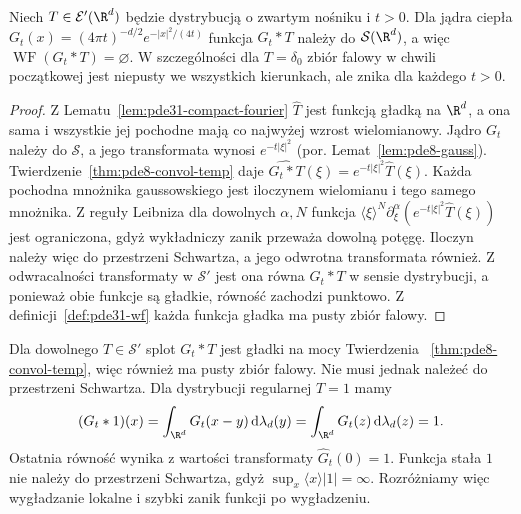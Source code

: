\begin{stwierdzenie}
\label{prop:pde-v44-heat-wavefront}
Niech $T\in\mathcal E'(\R^d)$ będzie dystrybucją
o zwartym nośniku i $t>0$. Dla jądra ciepła
$G_t(x)=(4\pi t)^{-d/2}e^{-|x|^2/(4t)}$
funkcja $G_t*T$ należy do $\mathcal S(\R^d)$,
a więc $\operatorname{WF}(G_t*T)=\varnothing$.
W szczególności dla $T=\delta_0$ zbiór falowy
w chwili początkowej jest niepusty we wszystkich
kierunkach, ale znika dla każdego $t>0$.
\end{stwierdzenie}
\begin{proof}
Z Lematu~\ref{lem:pde31-compact-fourier}
$\widehat T$ jest funkcją gładką na $\R^d$,
a ona sama i wszystkie jej pochodne mają
co najwyżej wzrost wielomianowy.
Jądro $G_t$ należy do $\mathcal S$, a jego
transformata wynosi $e^{-t|\xi|^2}$
(por. Lemat~\ref{lem:pde8-gauss}).
Twierdzenie~\ref{thm:pde8-convol-temp} daje
$\widehat{G_t*T}(\xi)=e^{-t|\xi|^2}\widehat T(\xi)$.
Każda pochodna mnożnika gaussowskiego jest
iloczynem wielomianu i tego samego mnożnika.
Z reguły Leibniza dla dowolnych $\alpha,N$
funkcja $\langle\xi\rangle^N
\partial_\xi^\alpha(e^{-t|\xi|^2}\widehat T(\xi))$
jest ograniczona, gdyż wykładniczy zanik
przeważa dowolną potęgę.
Iloczyn należy więc do przestrzeni Schwartza,
a jego odwrotna transformata również.
Z odwracalności transformaty w $\mathcal S'$
jest ona równa $G_t*T$ w sensie dystrybucji,
a ponieważ obie funkcje są gładkie,
równość zachodzi punktowo.
Z definicji~\ref{def:pde31-wf} każda funkcja gładka
ma pusty zbiór falowy.
\end{proof}
\begin{uwaga}
Dla dowolnego $T\in\mathcal S'$ splot $G_t*T$
jest gładki na mocy Twierdzenia
~\ref{thm:pde8-convol-temp}, więc również ma pusty
zbiór falowy. Nie musi jednak należeć do
przestrzeni Schwartza. Dla dystrybucji regularnej
$T=1$ mamy
\[
 (G_t*1)(x)=\int_{\R^d}G_t(x-y)\,\mathrm d\lambda_d(y)
 =\int_{\R^d}G_t(z)\,\mathrm d\lambda_d(z)=1.
\]
Ostatnia równość wynika z wartości transformaty
$\widehat G_t(0)=1$. Funkcja stała $1$ nie należy
do przestrzeni Schwartza, gdyż
$\sup_x\langle x\rangle|1|=\infty$.
Rozróżniamy więc wygładzanie lokalne i szybki
zanik funkcji po wygładzeniu.
\end{uwaga}
